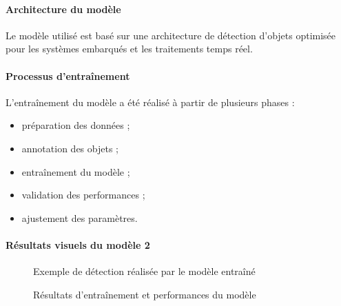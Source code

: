 
\paragraph{Architecture du modèle}

Le modèle utilisé est basé sur une architecture de détection d’objets optimisée pour les systèmes embarqués et les traitements temps réel.


\paragraph{Processus d’entraînement}

L’entraînement du modèle a été réalisé à partir de plusieurs phases :

\begin{itemize}
    \item préparation des données ;
    
    \item annotation des objets ;
    
    \item entraînement du modèle ;
    
    \item validation des performances ;
    
    \item ajustement des paramètres.
\end{itemize}


\paragraph{Résultats visuels du modèle 2}

\begin{figure}[H]
    \centering
    \caption{Exemple de détection réalisée par le modèle entraîné}
    \label{fig:model2_detection}
\end{figure}

\begin{figure}[H]
    \centering
    \caption{Résultats d'entraînement et performances du modèle}
    \label{fig:model2_metrics}
\end{figure}

